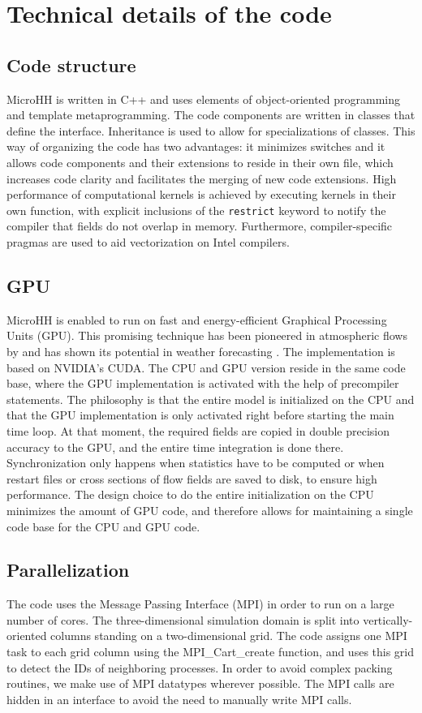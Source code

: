 \documentclass[gmd,manuscript]{copernicus}
\begin{document}
\section{Technical details of the code}\label{sec:technical}
\subsection{Code structure}
MicroHH is written in C++ and uses elements of object-oriented programming and template metaprogramming. The code components are written in classes that define the interface. Inheritance is used to allow for specializations of classes. This way of organizing the code has two advantages: it minimizes switches and it allows code components and their extensions to reside in their own file, which increases code clarity and facilitates the merging of new code extensions. High performance of computational kernels is achieved by executing kernels in their own function, with explicit inclusions of the \texttt{restrict} keyword to notify the compiler that fields do not overlap in memory. Furthermore, compiler-specific pragmas are used to aid vectorization on Intel compilers.

\subsection{GPU}
MicroHH is enabled to run on fast and energy-efficient Graphical Processing Units (GPU). This promising technique has been pioneered in atmospheric flows by \citet{Schalkwijk2012} and has shown its potential in weather forecasting \citep{Schalkwijk2015}. The implementation is based on NVIDIA's CUDA. The CPU and GPU version reside in the same code base, where the GPU implementation is activated with the help of precompiler statements. The philosophy is that the entire model is initialized on the CPU and that the GPU implementation is only activated right before starting the main time loop.  At that moment, the required fields are copied in double precision accuracy to the GPU, and the entire time integration is done there. Synchronization only happens when statistics have to be computed or when restart files or cross sections of flow fields are saved to disk, to ensure high performance. The design choice to do the entire initialization on the CPU minimizes the amount of GPU code, and therefore allows for maintaining a single code base for the CPU and GPU code.

\subsection{Parallelization}
The code uses the Message Passing Interface (MPI) in order to run on a large number of cores. The three-dimensional simulation domain is split into vertically-oriented columns standing on a two-dimensional grid. The code assigns one MPI task to each grid column using the MPI\_Cart\_create function, and uses this grid to detect the IDs of neighboring processes. In order to avoid complex packing routines, we make use of MPI datatypes wherever possible. The MPI calls are hidden in an interface to avoid the need to manually write MPI calls.
\end{document}

